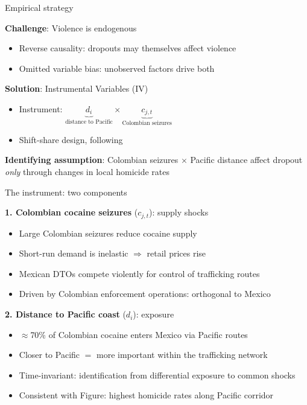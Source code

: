 \documentclass[aspectratio=169]{beamer}
\begin{document}
\begin{frame}{Empirical strategy}

\textbf{Challenge}: Violence is endogenous
\begin{itemize}
    \item Reverse causality: dropouts may themselves affect violence
    \item Omitted variable bias: unobserved factors drive both
\end{itemize}

\vspace{0.5cm}
\pause

\textbf{Solution}: Instrumental Variables (IV)
\begin{itemize}
    \item Instrument: $\underbrace{d_i}_{\text{distance to Pacific}} \times \underbrace{c_{j,t}}_{\text{Colombian seizures}}$
    \item Shift-share design, following \citet{dubevargas}
\end{itemize}

\vspace{0.5cm}
\pause

\textbf{Identifying assumption}: Colombian seizures $\times$ Pacific distance affect dropout \emph{only} through changes in local homicide rates

\end{frame}


\begin{frame}{The instrument: two components}

\textbf{1. Colombian cocaine seizures} ($c_{j,t}$): supply shocks
\begin{itemize}
    \item Large Colombian seizures reduce cocaine supply
    \item Short-run demand is inelastic $\Rightarrow$ retail prices rise
    \item Mexican DTOs compete violently for control of trafficking routes
    \item Driven by Colombian enforcement operations: orthogonal to Mexico
\end{itemize}

\vspace{0.5cm}
\pause

\textbf{2. Distance to Pacific coast} ($d_i$): exposure
\begin{itemize}
    \item $\approx$70\% of Colombian cocaine enters Mexico via Pacific routes
    \item Closer to Pacific $=$ more important within the trafficking network
    \item Time-invariant: identification from differential exposure to common shocks
    \item Consistent with Figure: highest homicide rates along Pacific corridor
\end{itemize}

\end{frame}
\end{document}
